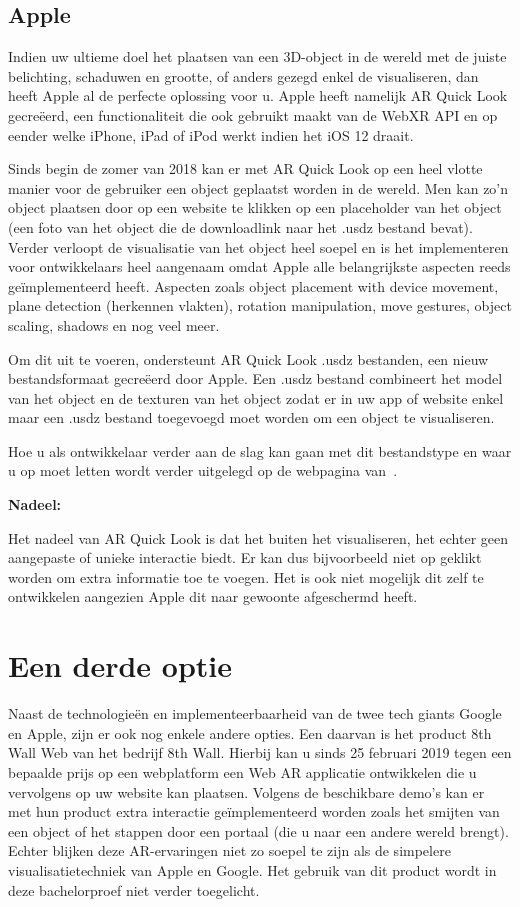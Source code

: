 \subsection{Apple}

Indien uw ultieme doel het plaatsen van een 3D-object in de wereld met de juiste belichting, schaduwen en grootte, of anders gezegd enkel de visualiseren, dan heeft Apple al de perfecte oplossing voor u. Apple heeft namelijk AR Quick Look gecreëerd, een functionaliteit die ook gebruikt maakt van de WebXR API en op eender welke iPhone, iPad of iPod werkt indien het iOS 12 draait. 

Sinds begin de zomer van 2018 kan er met AR Quick Look op een heel vlotte manier voor de gebruiker een object geplaatst worden in de wereld. Men kan zo'n object plaatsen door op een website te klikken op een placeholder van het object (een foto van het object die de downloadlink naar het .usdz bestand bevat). Verder verloopt de visualisatie van het object heel soepel en is het implementeren voor ontwikkelaars heel aangenaam omdat Apple alle belangrijkste aspecten reeds geïmplementeerd heeft. Aspecten zoals object placement with device movement, plane detection (herkennen vlakten), rotation manipulation, move gestures, object scaling, shadows en nog veel meer. 

Om dit uit te voeren, ondersteunt AR Quick Look .usdz bestanden, een nieuw bestandsformaat gecreëerd door Apple. Een .usdz bestand combineert het model van het object en de texturen van het object zodat er in uw app of website enkel maar een .usdz bestand toegevoegd moet worden om een object te visualiseren. 

Hoe u als ontwikkelaar verder aan de slag kan gaan met dit bestandstype en waar u op moet letten wordt verder uitgelegd op de webpagina van~\textcite{Apple2018}.

\textbf{Nadeel:}

Het nadeel van AR Quick Look is dat het buiten het visualiseren, het echter geen aangepaste of unieke interactie biedt. Er kan dus bijvoorbeeld niet op geklikt worden om extra informatie toe te voegen. Het is ook niet mogelijk dit zelf te ontwikkelen aangezien Apple dit naar gewoonte afgeschermd heeft. 

\section{Een derde optie}
\label{sec:een-derde-optie}

Naast de technologieën en implementeerbaarheid van de twee tech giants Google en Apple, zijn er ook nog enkele andere opties. Een daarvan is het product 8th Wall Web van het bedrijf 8th Wall. Hierbij kan u sinds 25 februari 2019 tegen een bepaalde prijs op een webplatform een Web AR applicatie ontwikkelen die u vervolgens op uw website kan plaatsen. Volgens de beschikbare demo's kan er met hun product extra interactie geïmplementeerd worden zoals het smijten van een object of het stappen door een portaal (die u naar een andere wereld brengt). Echter blijken deze AR-ervaringen niet zo soepel te zijn als de simpelere visualisatietechniek van Apple en Google. Het gebruik van dit product wordt in deze bachelorproef niet verder toegelicht.

